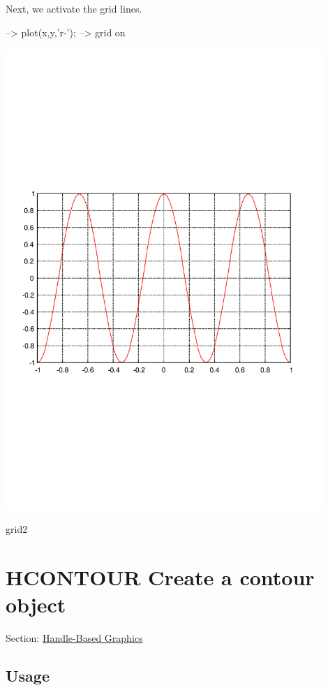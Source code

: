 Next, we activate the grid lines.


\begin{DoxyVerbInclude}
--> plot(x,y,'r-');
--> grid on
\end{DoxyVerbInclude}


 
\begin{DoxyImage}
\includegraphics[width=12cm]{grid2}
\caption{grid2}
\end{DoxyImage}
 \hypertarget{handle_hcontour}{}\section{H\-C\-O\-N\-T\-O\-U\-R Create a contour object}\label{handle_hcontour}
Section\-: \hyperlink{sec_handle}{Handle-\/\-Based Graphics} \hypertarget{vtkwidgets_vtkxyplotwidget_Usage}{}\subsection{Usage}\label{vtkwidgets_vtkxyplotwidget_Usage}
